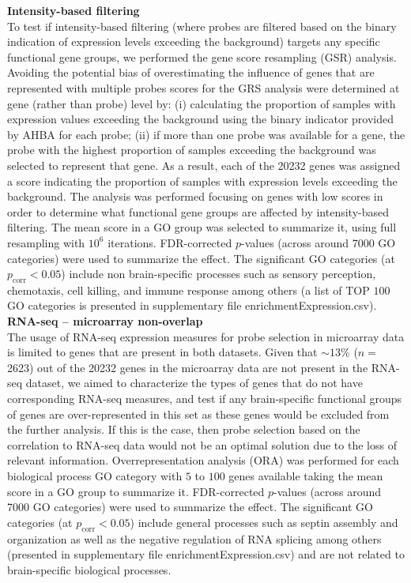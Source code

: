 \documentclass[10pt,A4]{article}
\begin{document}
\textbf{Intensity-based filtering}\\
To test if intensity-based filtering (where probes are filtered based on the binary indication of expression levels exceeding the background) targets any specific functional gene groups, we performed the gene score resampling (GSR) analysis. Avoiding the potential bias of overestimating the influence of genes that are represented with multiple probes scores for the GRS analysis were determined at gene (rather than probe) level by: (i) calculating the proportion of samples with expression values exceeding the background using the binary indicator provided by AHBA for each probe; (ii) if more than one probe was available for a gene, the probe with the highest proportion of samples exceeding the background was selected to represent that gene. As a result, each of the \num{20232} genes was assigned a score indicating the proportion of samples with expression levels exceeding the background. The analysis was performed focusing on genes with low scores in order to determine what functional gene groups are affected by intensity-based filtering. The mean score in a GO group was selected to summarize it, using full resampling with $10^{6}$ iterations. FDR-corrected $p$-values (across around \num{7000} GO categories) were used to summarize the effect. The significant GO categories (at $p_\mathrm{corr}<0.05$) include non brain-specific processes such as sensory perception, chemotaxis, cell killing, and immune response among others (a list of TOP $100$ GO categories is presented in supplementary file enrichmentExpression.csv). \\

\textbf{RNA-seq – microarray non-overlap}\\
The usage of RNA-seq expression measures for probe selection in microarray data is limited to genes that are present in both datasets. Given that $\sim13\%$ ($n=$\num{2623}) out of the  \num{20232} genes in the microarray data are not present in the RNA-seq dataset, we aimed to characterize the types of genes that do not have corresponding RNA-seq measures, and test if any brain-specific functional groups of genes are over-represented in this set as these genes would be excluded from the further analysis. If this is the case, then probe selection based on the correlation to RNA-seq data would not be an optimal solution due to the loss of relevant information. Overrepresentation analysis (ORA) was performed for each biological process GO category with $5$ to $100$ genes available taking the mean score in a GO group to summarize it. FDR-corrected $p$-values (across around \num{7000} GO categories) were used to summarize the effect. The significant GO categories (at $p_\mathrm{corr}<0.05$) include general processes such as septin assembly and organization as well as the negative regulation of RNA splicing among others (presented in supplementary file enrichmentExpression.csv) and are not related to brain-specific biological processes. \\
\end{document}
